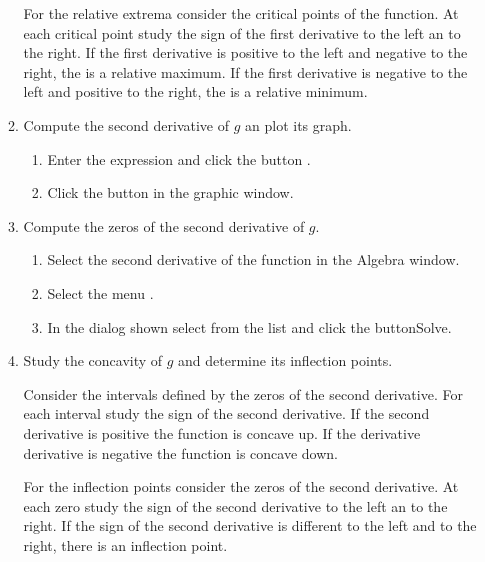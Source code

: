\begin{enumerate}[leftmargin=*]
\begin{enumerate}
\begin{indication}
For the relative extrema consider the critical points of the function. 
At each critical point study the sign of the first derivative to the left an to the right. 
If the first derivative is positive to the left and negative to the right, the is a relative maximum. 
If the first derivative is negative to the left and positive to the right, the is a relative minimum. 
\end{indication}

\item Compute the second derivative of $g$ an plot its graph.
\begin{indication}
\begin{enumerate}
\item Enter the expression  and click the button .
\item Click the button  in the graphic window.
\end{enumerate}
\end{indication}

\item Compute the zeros of the second derivative of $g$.
\begin{indication}
\begin{enumerate}
\item Select the second derivative of the function in the Algebra window.
\item Select the menu .
\item In the dialog shown select  from the  list and click the button{Solve}.
\end{enumerate}
\end{indication}

\item Study the concavity of $g$ and determine its inflection points. 
\begin{indication}
Consider the intervals defined by the zeros of the second derivative. 
For each interval study the sign of the second derivative. 
If the second derivative is positive the function is concave up. 
If the derivative derivative is negative the function is concave down.

For the inflection points consider the zeros of the second derivative. 
At each zero study the sign of the second derivative to the left an to the right. 
If the sign of the second derivative is different to the left and to the right, there is an inflection point. 
\end{indication}
\end{enumerate}

\end{enumerate}



